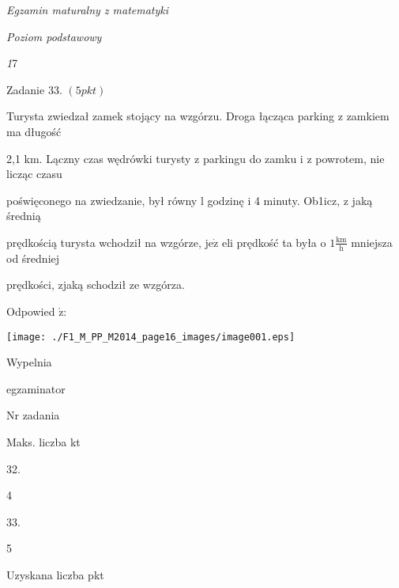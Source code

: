 \documentclass[a4paper,12pt]{article}
\begin{document}
{\it Egzamin maturalny z matematyki}

{\it Poziom podstawowy}

{\it 1}7

Zadanie 33. $(5pkt)$

Turysta zwiedzał zamek stojący na wzgórzu. Droga łącząca parking z zamkiem ma długość

2,1 km. Lączny czas wędrówki turysty z parkingu do zamku i z powrotem, nie licząc czasu

poświęconego na zwiedzanie, był równy l godzinę i 4 minuty. Ob1icz, z jaką średnią

prędkością turysta wchodził na wzgórze, $\mathrm{j}\mathrm{e}\dot{\mathrm{z}}$ eli prędkość ta była o $1 \displaystyle \frac{\mathrm{k}\mathrm{m}}{\mathrm{h}}$ mniejsza od średniej

prędkości, zjaką schodził ze wzgórza.

Odpowied $\acute{\mathrm{z}}$:
\begin{center}
\texttt{[image: ./F1\_M\_PP\_M2014\_page16\_images/image001.eps]}
\end{center}
Wypelnia

egzaminator

Nr zadania

Maks. liczba kt

32.

4

33.

5

Uzyskana liczba pkt
\end{document}
